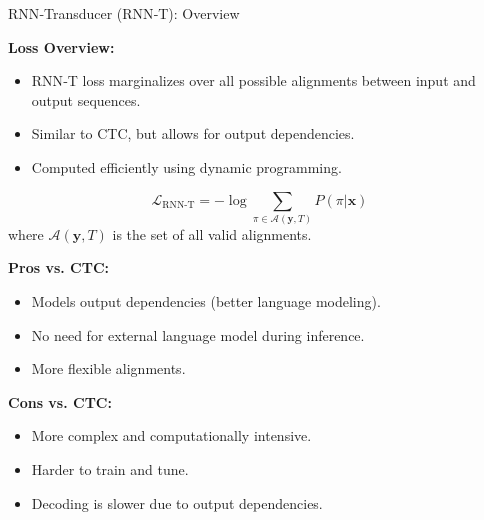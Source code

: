 \begin{frame}[t,allowframebreaks]{RNN‑Transducer (RNN‑T): Overview}
    \framebreak

    \textbf{Loss Overview:}
    \begin{itemize}
        \item RNN‑T loss marginalizes over all possible alignments between input and output sequences.
        \item Similar to CTC, but allows for output dependencies.
        \item Computed efficiently using dynamic programming.
    \end{itemize}

    \begin{equation}
        \mathcal{L}_{\text{RNN-T}} = -\log \sum_{\pi \in \mathcal{A}(\mathbf{y}, T)} P(\pi | \mathbf{x})
    \end{equation}
    where $\mathcal{A}(\mathbf{y}, T)$ is the set of all valid alignments.

    \framebreak

    \textbf{Pros vs. CTC:}
    \begin{itemize}
        \item Models output dependencies (better language modeling).
        \item No need for external language model during inference.
        \item More flexible alignments.
    \end{itemize}

    \textbf{Cons vs. CTC:}
    \begin{itemize}
        \item More complex and computationally intensive.
        \item Harder to train and tune.
        \item Decoding is slower due to output dependencies.
    \end{itemize}
\end{frame}